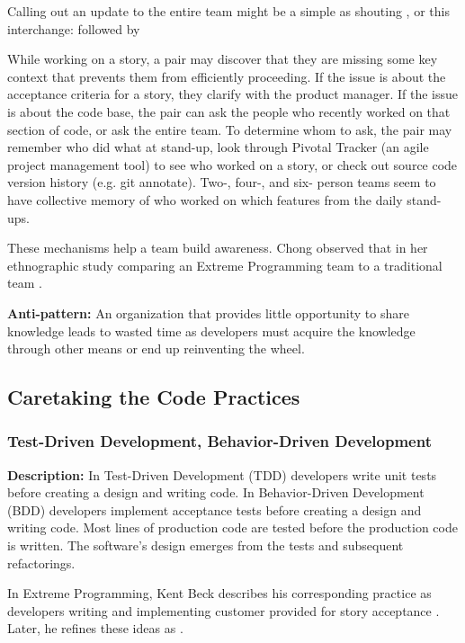 Calling out an update to the entire team might be a simple as shouting , or this interchange:  followed by 

While working on a story, a pair may discover that they are missing some key context that prevents them from efficiently proceeding. If the issue is about the acceptance criteria for a story, they clarify with the product manager. If the issue is about the code base, the pair can ask the people who recently worked on that section of code, or ask the entire team. To determine whom to ask, the pair may remember who did what at stand-up, look through Pivotal Tracker (an agile project management tool) to see who worked on a story, or check out source code version history (e.g. git annotate). Two-, four-, and six- person teams seem to have collective memory of who worked on which features from the daily stand-ups. 

These mechanisms help a team build awareness. Chong observed that  in her ethnographic study comparing an Extreme Programming team to a traditional team \cite{ChongNominum}.
 
\textbf{Anti-pattern:} An organization that provides little opportunity to share knowledge leads to wasted time as developers must acquire the knowledge through other means or end up reinventing the wheel.
\subsection{Caretaking the Code Practices}
\subsubsection{Test-Driven Development, Behavior-Driven Development}
\textbf{Description:} In Test-Driven Development (TDD) developers write unit tests before creating a design and writing code. In Behavior-Driven Development (BDD) developers implement acceptance tests before creating a design and writing code. Most lines of production code are tested before the production code is written. The software's design emerges from the tests and subsequent refactorings.

In Extreme Programming, Kent Beck describes his corresponding  practice as developers writing  and implementing customer provided  for story acceptance \cite{BeckExtremeProgramming2000}. Later, he refines these ideas as  \cite{BeckExtremeProgramming2004}. 

